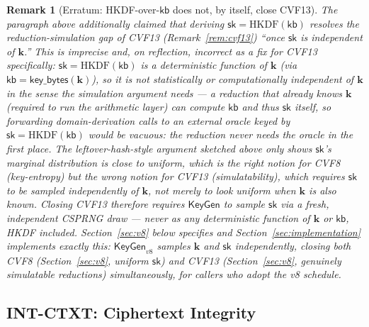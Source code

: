 \documentclass[11pt,a4paper]{article}
\newtheorem{remark}[theorem]{Remark}
\begin{document}
\begin{remark}[Erratum: HKDF-over-$\mathsf{kb}$ does not, by itself, close CVF13]
\label{rem:cvf8-kdf-erratum}
The paragraph above additionally claimed that deriving
$\mathsf{sk}=\mathrm{HKDF}(\mathsf{kb})$ resolves the reduction-simulation
gap of CVF13 (Remark~\ref{rem:cvf13}) ``once $\mathsf{sk}$ is independent
of $\mathbf{k}$.'' This is imprecise and, on reflection, incorrect as a
fix for CVF13 specifically: $\mathsf{sk}=\mathrm{HKDF}(\mathsf{kb})$ is a
\emph{deterministic function} of $\mathbf{k}$ (via
$\mathsf{kb}=\mathsf{key\_bytes}(\mathbf{k})$), so it is not
statistically or computationally independent of $\mathbf{k}$ in the sense
the simulation argument needs --- a reduction that already knows
$\mathbf{k}$ (required to run the arithmetic layer) can compute
$\mathsf{kb}$ and thus $\mathsf{sk}$ itself, so forwarding
domain-derivation calls to an external oracle keyed by
$\mathsf{sk}=\mathrm{HKDF}(\mathsf{kb})$ would be vacuous: the reduction
never needs the oracle in the first place. The leftover-hash-style
argument sketched above only shows $\mathsf{sk}$'s \emph{marginal}
distribution is close to uniform, which is the right notion for CVF8
(key-entropy) but the wrong notion for CVF13 (simulatability), which
requires $\mathsf{sk}$ to be sampled \emph{independently of} $\mathbf{k}$,
not merely to look uniform when $\mathbf{k}$ is also known. Closing CVF13
therefore requires $\mathsf{KeyGen}$ to sample $\mathsf{sk}$ via a fresh,
independent CSPRNG draw --- never as any deterministic function of
$\mathbf{k}$ or $\mathsf{kb}$, HKDF included. Section~\ref{sec:v8} below
specifies and Section~\ref{sec:implementation} implements exactly this:
$\mathsf{KeyGen}_{v8}$ samples $\mathbf{k}$ and $\mathsf{sk}$ independently,
closing both CVF8 (Section~\ref{sec:v8}, uniform $\mathsf{sk}$) and CVF13
(Section~\ref{sec:v8}, genuinely simulatable reductions) simultaneously,
for callers who adopt the v8 schedule.
\end{remark}

\subsection{INT-CTXT: Ciphertext Integrity}
\end{document}
